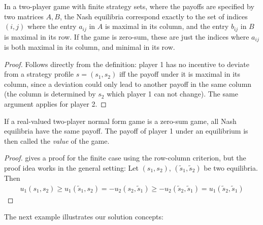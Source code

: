 \documentclass[a4paper]{scrreprt}
\begin{document}
    \begin{lemma}
        In a two-player game with finite strategy sets, where the payoffs are specified by two matrices $A, B$, the Nash equilibria correspond
        exactly to the set of indices $(i, j)$ where the entry $a_{ij}$ in $A$ is maximal in its column, and the entry $b_{ij}$ in $B$ is maximal in its row.
        If the game is zero-sum, these are just the indices where $a_{ij}$ is both maximal in its column, and minimal in its row.
    \end{lemma}
    \begin{proof}
        Follows directly from the definition: player 1 has no incentive to deviate from a strategy profile $s = (s_1, s_2)$ iff the payoff under it is maximal in its column, since a deviation could only lead to another payoff in the same column (the column is determined by $s_2$ which player 1 can not change). The same argument applies for player 2.
    \end{proof}


    \begin{lemma}
        If a real-valued two-player normal form game is a zero-sum game, all Nash equilibria have the same payoff.
        The payoff of player 1 under an equilibrium is then called the \emph{value} of the game.
    \end{lemma}
    \begin{proof}
        \cite[p.15]{bib:matsumotoGameTheory} gives a proof for the finite case using the row-column criterion, but the proof idea works in the general setting:
        Let $(s_1, s_2)$, $(\tilde{s}_1, \tilde{s}_2)$ be two equilibria.
        Then
        \begin{gather*}
            u_1(s_1, s_2) \geq u_1(\tilde{s}_1, s_2) = -u_2(s_2, \tilde{s}_1) \geq -u_2(\tilde{s}_2, \tilde{s}_1) = u_1(\tilde{s}_2, \tilde{s}_1)
        \end{gather*}      
    \end{proof}
    
    The next example illustrates our solution concepts:
    
\end{document}

